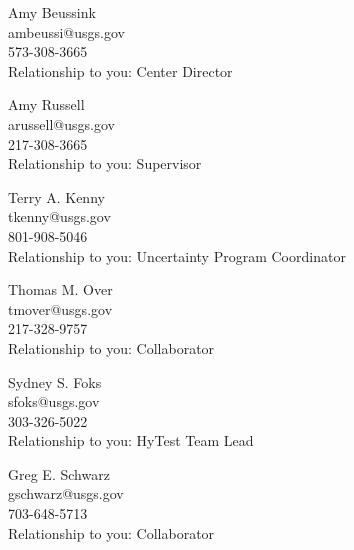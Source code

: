 \documentclass[12pt]{article}
\begin{document}
\begin{multicols}{2}
\raggedright

Amy Beussink\\
ambeussi@usgs.gov \\
573-308-3665 \\
Relationship to you: Center Director

\vspace{10pt}

Amy Russell\\
arussell@usgs.gov \\
217-308-3665\\
Relationship to you: Supervisor

\vspace{10pt}

Terry A. Kenny\\
tkenny@usgs.gov  \\
801-908-5046\\
Relationship to you: Uncertainty Program Coordinator

\vspace{10pt}

Thomas M. Over\\
tmover@usgs.gov\\
217-328-9757\\
Relationship to you: Collaborator

\vspace{10pt}

Sydney S. Foks\\
sfoks@usgs.gov \\
303-326-5022\\
Relationship to you: HyTest Team Lead

\vspace{10pt}
Greg E. Schwarz\\
gschwarz@usgs.gov\\
703-648-5713\\
Relationship to you: Collaborator


\end{multicols}
\end{document}

